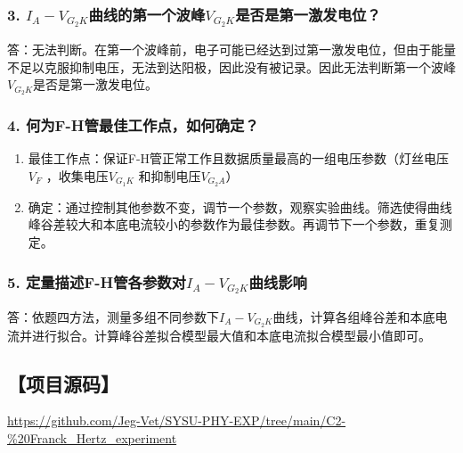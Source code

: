 \documentclass[12pt,a4paper,UTF8]{ctexart}
\begin{document}
	\subsubsection*{3. $I_A-V_{G_2K}$曲线的第一个波峰$V_{G_2K}$是否是第一激发电位？}
		答：无法判断。在第一个波峰前，电子可能已经达到过第一激发电位，但由于能量不足以克服抑制电压，无法到达阳极，因此没有被记录。因此无法判断第一个波峰$V_{G_2K}$是否是第一激发电位。
	\subsubsection*{4. 何为F-H管最佳工作点，如何确定？}
		\begin{enumerate}[label=\arabic*.]
			\item 最佳工作点：保证F-H管正常工作且数据质量最高的一组电压参数（灯丝电压$V_F$  ，收集电压$V_{G_1K}$ 和抑制电压$V_{G_2A}$）
			\item 确定：通过控制其他参数不变，调节一个参数，观察实验曲线。筛选使得曲线峰谷差较大和本底电流较小的参数作为最佳参数。再调节下一个参数，重复测定。
		\end{enumerate}
	\subsubsection*{5. 定量描述F-H管各参数对$I_A-V_{G_2K}$曲线影响}
		答：依题四方法，测量多组不同参数下$I_A-V_{G_2K}$曲线，计算各组峰谷差和本底电流并进行拟合。计算峰谷差拟合模型最大值和本底电流拟合模型最小值即可。

\subsection*{【项目源码】}
\url{https://github.com/Jeg-Vet/SYSU-PHY-EXP/tree/main/C2-%20Franck_Hertz_experiment}
		
\end{document}
